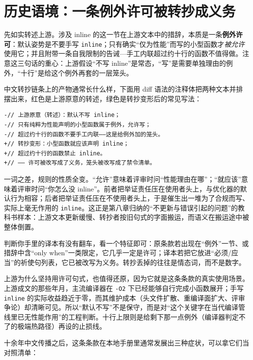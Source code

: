 \documentclass[12pt,a4paper,fontset=fandol]{ctexbook}
\newcommand{\Tp}[1]{\texttt{#1}}
\begin{document}
\section{历史语境：一条例外许可被转抄成义务}
\label{sec:ch09-history}

先如实转述上游。涉及 inline 的这一节在上游文本中的措辞，本质是一条\textbf{例外许可}：默认姿势是不要手写 \Tp{inline}；只有确实``仅为性能''而写的小型函数才\textit{被允许}使用它；并且附带一条自我限制的告诫---手工内联超过约十行的函数不值得做。注意这三句话的重心：上游假设``不写 inline''是常态，``写''是需要单独理由的例外，``十行''是给这个例外再套的一层笼头。

中文转抄链条上的产物通常长什么样，下面用 diff 语法的注释体把两种文本并排摆出来，红色是上游原意的转述，绿色是转抄变形后的常见写法：

\begin{lstlisting}[style=diffstyle]
-// 上游原意（转述）：默认不写 inline；
-// 只有纯粹为性能声明的小型函数属于例外，允许写；
-// 超过约十行的函数不要手工内联——这是给例外加的笼头。
+// 转抄变形：小型函数就应该声明 inline；
+// 超过约十行的函数禁止 inline。
+// —— 许可被改写成了义务，笼头被改写成了禁令清单。
\end{lstlisting}

一词之差，规则的性质全变。``允许''意味着评审时问``性能理由在哪''；``就应该''意味着评审时问``你怎么没 inline''。前者把举证责任压在使用者头上，与优化器的默认行为相容；后者把举证责任压在不使用者头上，于是催生出一堆为了合规而写、实际上毫无作用的 \Tp{inline}。这正是第八章归纳的``不更新与错误引起的问题''的教科书样本：上游文本更新缓慢、转抄者按旧句式的字面搬运，而语义在搬运途中被整体倒置。

\begin{note}[title={倒置的识别特征}]
判断你手里的译本有没有翻车，看一个特征即可：原条款若出现在``例外''一节、或措辞中含``only when''一类限定，它几乎一定是许可；译本若把它放进``必须/应当''的祈使句列表，它已被改写为义务。转抄丢掉的往往是情态词，而不是数字。
\end{note}

上游为什么坚持用许可句式，也值得还原，因为它就是这条条款的真实使用场景。上游成文的那些年月，主流编译器在 \Tp{-O2} 下已经能够自行完成小函数展开；手写 \Tp{inline} 的实际收益趋近于零，而其维护成本（头文件扩散、重编译面扩大、评审争论）却清晰可见。所以``默认不写''不是保守，而是对``这个关键字在当代编译管线里已无性能作用''的工程判断。十行上限则是给剩下那一点例外（编译器判定不了的极端热路径）再设的止损线。

十余年中文传播之后，这条条款在本地手册里通常发展出三种症状，可以拿它们当对照清单：
\end{document}
